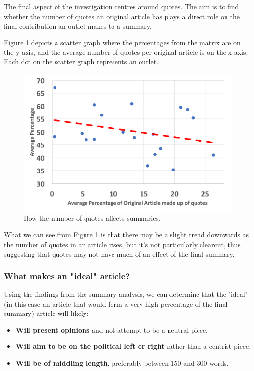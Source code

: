 \documentclass[12pt]{article}
\begin{document}
The final aspect of the investigation centres around quotes. The aim is to find whether the number of quotes an original article has plays a direct role on the final contribution an outlet makes to a summary.

Figure \ref{quotes} depicts a scatter graph where the percentages from the matrix are on the y-axis, and the average number of quotes per original article is on the x-axis. Each dot on the scatter graph represents an outlet.

\begin{figure}[ht!]
  \centering
    \includegraphics[scale=0.6]{quotes.png}
   \caption[A graph depicting responses to the User Interface Survey]{How the number of quotes affects summaries.}
   \label{quotes}
\end{figure}

What we can see from Figure \ref{quotes} is that there may be a slight trend downwards as the number of quotes in an article rises, but it's not particularly clearcut, thus suggesting that quotes may not have much of an effect of the final summary. 

\subsubsection{What makes an "ideal" article?}

Using the findings from the summary analysis, we can determine that the "ideal" (in this case an article that would form a very high percentage of the final summary) article will likely:

\begin{itemize}
	\item \textbf{Will present opinions} and not attempt to be a neutral piece. 
	\item \textbf{Will aim to be on the political left or right} rather than a centrist piece.
	\item \textbf{Will be of middling length}, preferably between 150 and 300 words.
\end{itemize}
\end{document}
